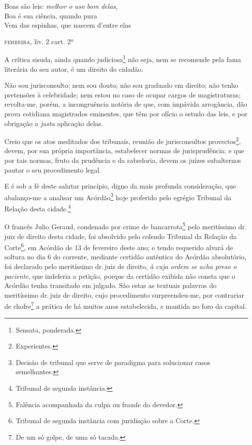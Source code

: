 \epigraph{Boas são leis: \emph{melhor o uso bom delas},\\
Boa é sua ciência, quando pura\\
Vem das espinhas, que nascem d'entre elas}{\textsc{ferreira}\footnotemark, liv. 2
cart. 2º\footnotemark}



A crítica sisuda, ainda quando judiciosa\footnote{ Sensata, ponderada.}
não seja, nem se recomende pela fama literária do seu autor, é um
direito do cidadão.

Não sou jurisconsulto; nem sou douto; não sou graduado em direito; não
tenho pretensões à celebridade; nem estou no caso de ocupar cargos de
magistraturas; revolta-me, porém, a incongruência notória de que, com
impávida arrogância, dão prova cotidiana magistrados eminentes, que têm
por ofício o estudo das leis, e por obrigação a \emph{justa} aplicação
delas.

Creio que os atos meditados dos tribunais, reunião de jurisconsultos
provectos\footnote{ Experientes.}, devem, por sua própria importância,
estabelecer normas de jurisprudência: e que por tais normas, fruto da
prudência e da sabedoria, devem os juízes subalternos pautar o seu
procedimento legal.

E é sob a fé deste salutar princípio, digno da mais profunda
consideração, que abalanço-me a analisar um Acórdão\footnote{ Decisão
  de tribunal que serve de paradigma para solucionar casos semelhantes.}
hoje proferido pelo egrégio Tribunal da Relação desta cidade.\footnote{
  Tribunal de segunda instância.}

O francês Julio Geraud, condenado por crime de bancarrota\footnote{
  Falência acompanhada da culpa ou fraude do devedor.} pelo meritíssimo
dr.\,juiz de direito desta cidade, foi absolvido pelo colendo Tribunal da
Relação da Corte\footnote{ Tribunal de segunda instância com juridisção
  sobre a Corte.}, em Acórdão de 13 de fevereiro deste ano; e tendo
requerido alvará de soltura no dia 6 do corrente, mediante certidão
autêntica do Acórdão absolutório, foi declarado pelo meritíssimo dr.\,juiz de direito, \emph{à cuja ordem se acha preso o paciente}, que
indeferia a petição, porque da certidão exibida não consta que o Acórdão
tenha transitado em julgado. São estas as textuais palavras do
meritíssimo dr.\,juiz de direito, cujo procedimento surpreendeu-me, por
contrariar de chofre\footnote{ De um só golpe, de uma só tacada.} a
prática de há muitos anos estabelecida, e mantida no foro da capital.

